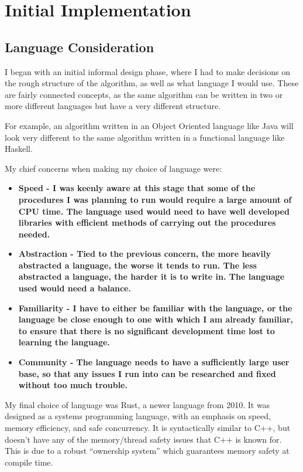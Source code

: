 \section{Initial Implementation}
\subsection{Language Consideration}
I began with an initial informal design phase, where I had to make decisions on the rough structure of the algorithm, as well as what language I would use. These are fairly connected concepts, as the same algorithm can be written in two or more different languages but have a very different structure.\newline

For example, an algorithm written in an Object Oriented language like Java will look very different to the same algorithm written in a functional language like Haskell. \newline

My chief concerns when making my choice of language were:
\begin{itemize}
    \item \bf Speed \rm - I was keenly aware at this stage that some of the procedures I was planning to run would require a large amount of CPU time. The language used would need to have well developed libraries with efficient methods of carrying out the procedures needed.
    \item \bf Abstraction \rm - Tied to the previous concern, the more heavily abstracted a language, the worse it tends to run. The less abstracted a language, the harder it is to write in. The language used would need a balance.
    \item \bf Familiarity \rm - I have to either be familiar with the language, or the language be close enough to one with which I am already familiar, to ensure that there is no significant development time lost to learning the language.
    \item \bf Community \rm - The language needs to have a sufficiently large user base, so that any issues I run into can be researched and fixed without too much trouble.
\end{itemize}

My final choice of language was Rust, a newer language from 2010. \cite{rustLang} It was designed as a systems programming language, with an emphasis on speed, memory efficiency, and safe concurrency. It is syntactically similar to C++, but doesn't have any of the memory/thread safety issues that C++ is known for. This is due to a robust ``ownership system'' which guarantees memory safety at compile time. \newline

